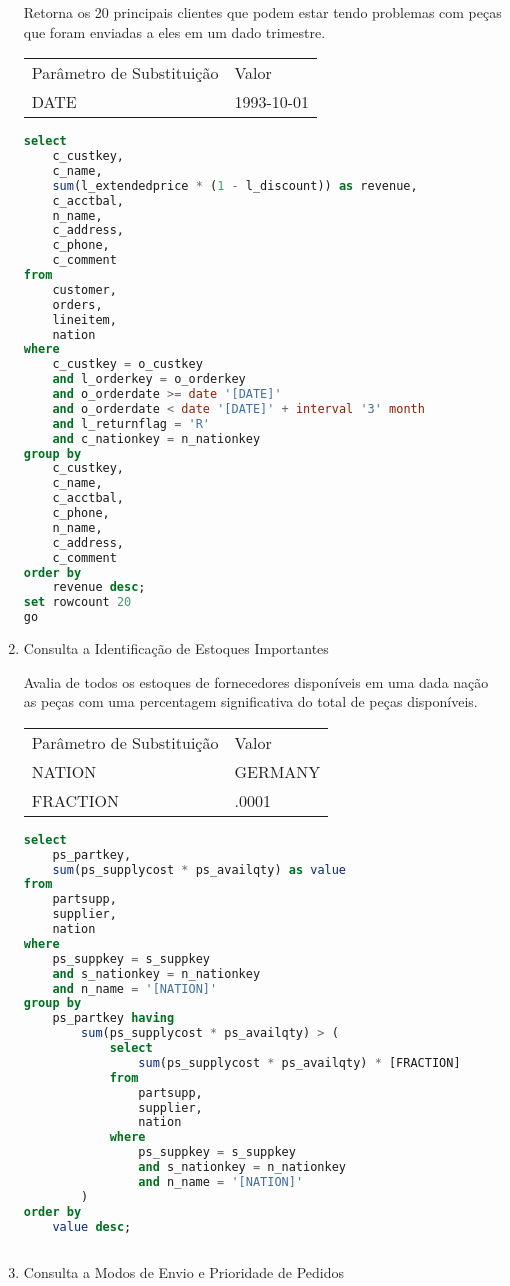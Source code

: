 \begin{enumerate}
    Retorna os 20 principais clientes que podem estar tendo problemas com peças que foram enviadas a eles em um dado trimestre.
    
\begin{tabular}{ll}
	Parâmetro de Substituição & Valor\\
	DATE & 1993-10-01\\
\end{tabular}

	\begin{lstlisting}[language=SQL]
select
	c_custkey,
	c_name,
	sum(l_extendedprice * (1 - l_discount)) as revenue,
	c_acctbal,
	n_name,
	c_address,
	c_phone,
	c_comment
from
	customer,
	orders,
	lineitem,
	nation
where
	c_custkey = o_custkey
	and l_orderkey = o_orderkey
	and o_orderdate >= date '[DATE]'
	and o_orderdate < date '[DATE]' + interval '3' month
	and l_returnflag = 'R'
	and c_nationkey = n_nationkey
group by
	c_custkey,
	c_name,
	c_acctbal,
	c_phone,
	n_name,
	c_address,
	c_comment
order by
	revenue desc;
set rowcount 20
go
	\end{lstlisting}

\item Consulta a Identificação de Estoques Importantes
    
    Avalia de todos os estoques de fornecedores disponíveis em uma dada nação as peças com uma percentagem significativa do total de peças disponíveis.
    
\begin{tabular}{ll}
	Parâmetro de Substituição & Valor\\
	NATION & GERMANY\\
	FRACTION & .0001\\
\end{tabular}

	\begin{lstlisting}[language=SQL]
select
	ps_partkey,
	sum(ps_supplycost * ps_availqty) as value
from
	partsupp,
	supplier,
	nation
where
	ps_suppkey = s_suppkey
	and s_nationkey = n_nationkey
	and n_name = '[NATION]'
group by
	ps_partkey having
		sum(ps_supplycost * ps_availqty) > (
			select
				sum(ps_supplycost * ps_availqty) * [FRACTION]
			from
				partsupp,
				supplier,
				nation
			where
				ps_suppkey = s_suppkey
				and s_nationkey = n_nationkey
				and n_name = '[NATION]'
		)
order by
	value desc;
	
	\end{lstlisting}

\item Consulta a Modos de Envio e Prioridade de Pedidos


\end{enumerate}
